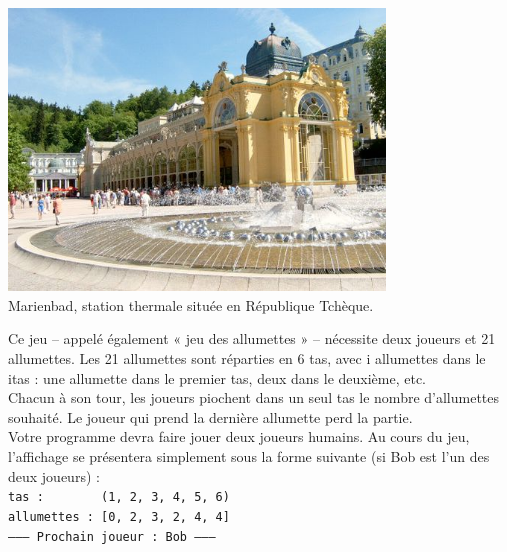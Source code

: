 \documentclass[a4paper,12pt,firamath,article]{nsi}
\begin{document}
\maketitle
\begin{center}
    \includegraphics[width = 10cm]{img/marienbad}\\
    \footnotesize Marienbad, station thermale située en République Tchèque.
\end{center}

Ce jeu – appelé également « jeu des allumettes » – nécessite deux joueurs et 21
allumettes. Les 21 allumettes sont réparties en 6 tas, avec i allumettes dans le i\eme tas : une allumette
dans le premier tas, deux dans le deuxième, etc.\\
Chacun à son tour, les joueurs piochent dans un seul tas le nombre d’allumettes
souhaité. Le joueur qui prend la dernière allumette perd la partie.\\

Votre programme devra faire jouer deux joueurs humains. Au cours du jeu, l’affichage se
présentera simplement sous la forme suivante (si Bob est l’un des deux joueurs) :\\

\texttt{tas : \ \ \ \ \ \ \ (1, 2, 3, 4, 5, 6)\\
allumettes : [0, 2, 3, 2, 4, 4]\\
-------- Prochain joueur : Bob --------\\}
\end{document}
